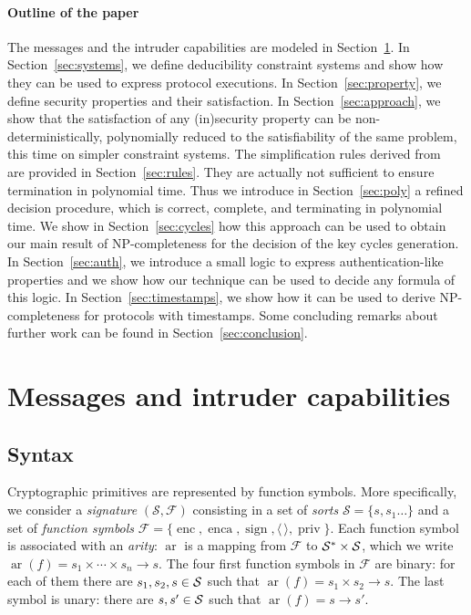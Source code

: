 \documentclass[acmtocl,acmnow]{acmtrans2m}
\newcommand{\enc}{\operatorname{enc}}
\newcommand{\enca}{\operatorname{enca}}
\newcommand{\sign}{\operatorname{sign}}
\newcommand{\priv}{\operatorname{priv}}
\newcommand{\ar}{\operatorname{ar}}
\newcommand{\dedsyss}[1]{deducibility constraint systems}
\begin{document}
\paragraph{Outline of the paper} 
The messages and the intruder capabilities are modeled in
Section~\ref{sec:syntax}. In Section~\ref{sec:systems}, we define
\dedsyss{} and show how they can be used to express protocol
executions. In Section~\ref{sec:property}, we define security
properties and their satisfaction. In
Section~\ref{sec:approach}, we show that the satisfaction
of any (in)security property can be non-deterministically, polynomially
reduced to the satisfiability of the same problem, this time on
simpler constraint systems.  The simplification rules derived
from~\cite{CS03} are provided in Section~\ref{sec:rules}. They are
actually not sufficient to ensure termination in polynomial time. Thus
we introduce in Section~\ref{sec:poly} a refined decision procedure,
which is correct, complete, and terminating in polynomial time. 
We show in Section~\ref{sec:cycles} how this approach can be used to
obtain our main result of NP-completeness for the decision 
of the  key cycles generation.  In Section~\ref{sec:auth}, we introduce a small logic to
express authentication-like properties and we show how our technique
can be used to decide any formula of this logic.  In
Section~\ref{sec:timestamps}, we show how it can be used to derive
NP-completeness for protocols with timestamps. Some concluding remarks
about further work can be found in Section~\ref{sec:conclusion}.





\section{Messages and intruder capabilities}\label{sec:syntax}
\subsection{Syntax}


Cryptographic primitives are represented by function symbols. More specifically, we consider a
\emph{signature} $(\mathcal{S}, \mathcal{F})$ consisting
in  a set of \emph{sorts} $\mathcal{S} = \{s,s_1\ldots\}$
and a set of \emph{function symbols} $\mathcal{F} = \{\enc, \enca, \sign, \langle\,\rangle, \priv\}$.
Each function symbol is associated with an \emph{arity}: $\ar$ is a mapping
from $\mathcal{F}$ to ${\cal S}^* \times {\cal S}$, which we write 
$\ar(f) = s_1\times \cdots \times s_n \rightarrow s$.
The four first function symbols in $\mathcal{F}$ are binary: for each of
them  there are $s_1,s_2,s\in {\cal S}$ such that
$\ar(f)= s_1 \times s_2 \rightarrow s$. The  last symbol is unary:
there are $s,s'\in {\cal S}$ such that $\ar(f)= s\rightarrow s'$.
\end{document}
